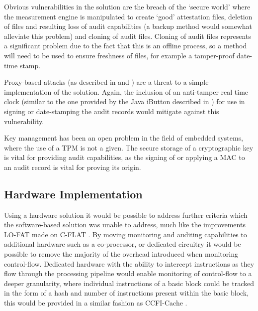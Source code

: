 Obvious vulnerabilities in the solution are the breach of the `secure world' where the measurement engine is manipulated to create `good' attestation files, deletion of files and resulting loss of audit capabilities (a backup method would somewhat alleviate this problem) and cloning of audit files. Cloning of audit files represents a significant problem due to the fact that this is an offline process, so a method will need to be used to ensure freshness of files, for example a tamper-proof date-time stamp.

Proxy-based attacks (as described in \cite{Seshadri2007} and \cite{Li2011}) are a threat to a simple implementation of the solution. Again, the inclusion of an anti-tamper real time clock (similar to the one provided by the Java iButton described in \cite{Chong2003}) for use in signing or date-stamping the audit records would mitigate against this vulnerability.

Key management has been an open problem in the field of embedded systems, where the use of a TPM is not a given. The secure storage of a cryptographic key is vital for providing audit capabilities, as the signing of or applying a MAC to an audit record is vital for proving its origin.

\subsection{Hardware Implementation}
Using a hardware solution it would be possible to address further criteria which the software-based solution was unable to address, much like the improvements LO-FAT\cite{Dessouky2017} made on C-FLAT \cite{Abera2016}. By moving monitoring and auditing capabilities to additional hardware such as a co-processor, or dedicated circuitry it would be possible to remove the majority of the overhead introduced when monitoring control-flow. Dedicated hardware with the ability to intercept instructions as they flow through the processing pipeline would enable monitoring of control-flow to a deeper granularity, where individual instructions of a basic block could be tracked in the form of a hash and number of instructions present within the basic block, this would be provided in a similar fashion as CCFI-Cache \cite{Danger2018}.
